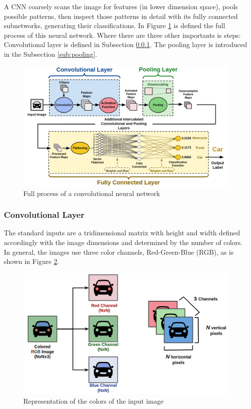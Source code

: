 A CNN coarsely scans the image for features (in lower dimension space), pools possible patterns, then inspect those patterns in detail with its fully connected
subnetworks, generating their classifications. In Figure \ref{fig:cnn_car} is defined the full process of this neural network. Where there are three other importants is steps: Convolutional layer is defined in Subsection \ref{sub:conv}. The pooling layer is introduced in the Subsection \ref{sub:pooling}.
\begin{figure}[H]
\centering
\includegraphics[width=\columnwidth]{imagens/Full_Process.png}
\caption{Full process of a convolutional neural network}
\label{fig:cnn_car}
\end{figure}


\subsubsection{Convolutional Layer}
\label{sub:conv}

The standard inputs are a tridimensional matrix with height and width defined accordingly with the image dimensions and determined by the number of colors. In general, the images use three color channels, Red-Green-Blue (RGB), as is shown in Figure \ref{fig:rgb}.

\begin{figure}[H]
\centering
\includegraphics[scale=0.35]{imagens/rgb_representation.png}
\caption{Representation of the colors of the input image}
\label{fig:rgb}
\end{figure}



